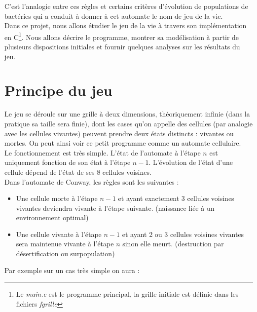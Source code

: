 \documentclass[12,french]{report}
\begin{document}
C'est l'analogie entre ces règles et certains critères d'évolution de populations de bactéries qui a conduit à donner à cet automate le nom de jeu de la vie.\\

Dans ce projet, nous allons étudier le jeu de la vie à travers son implémentation en C\footnote{Le \textit{main.c} est le programme principal, la grille initiale est définie dans les fichiers \textit{fgrille}}. Nous allons décrire le programme, montrer sa modélisation à partir de plusieurs dispositions initiales et fournir quelques analyses sur les résultats du jeu.

\chapter{Principe du jeu}

Le jeu se déroule sur une grille à deux dimensions, théoriquement infinie (dans la pratique sa taille sera finie), dont les cases qu'on appelle des cellules (par analogie avec les cellules vivantes) peuvent prendre deux états distincts : vivantes ou mortes. On peut ainsi voir ce petit programme comme un automate cellulaire.\\

 Le fonctionnement est très simple. L'état de l'automate à l'étape $n$ est uniquement fonction de son état à l'étape $n-1$. L'évolution de l'état d'une cellule dépend de l'état de ses 8 cellules voisines.\\

Dans l'automate de Conway, les règles sont les suivantes :
\begin{itemize}[label=\textbullet]
	\item Une cellule morte à l'étape $n-1$ et ayant exactement 3 cellules voisines vivantes deviendra vivante à l'étape suivante. (naissance liée à un environnement optimal)
	\item Une cellule vivante à l'étape $n-1$ et ayant 2 ou 3 cellules voisines vivantes sera maintenue vivante à l'étape $n$ sinon elle meurt. (destruction par désertification ou surpopulation)
\end{itemize}\vspace{0.3cm}

Par exemple sur un cas très simple on aura : \vspace{0.1cm}
\end{document}
